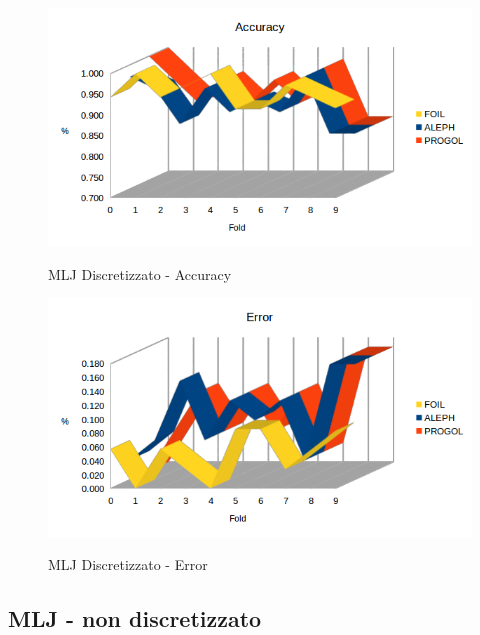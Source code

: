 \begin{figure}[H]
	\includegraphics[width=1.1\textwidth]{img/datasetGraph/mlj/discr/accuracy.png}
	\label{mljdiscr-Accuracy}
	\caption{MLJ Discretizzato - Accuracy}
\end{figure}

\begin{figure}[H]
	\includegraphics[width=1.1\textwidth]{img/datasetGraph/mlj/discr/error.png}
	\label{mljdiscr-Error}
	\caption{MLJ Discretizzato - Error}
\end{figure}

\subsection{MLJ - non discretizzato}
